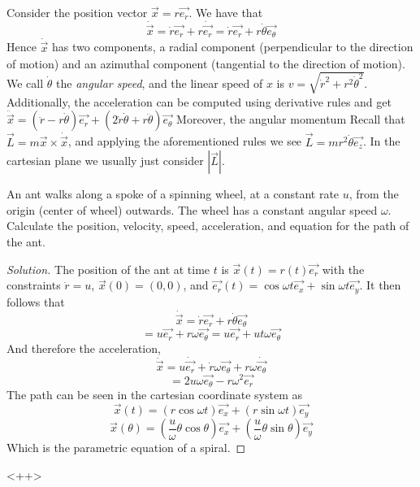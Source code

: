 \begin{example}
  Consider the position vector $\vec{x}=r\vec{e_r}$. We have that 
  \[\dot{\vec{x}}= \dot{r} \vec{e_r} + r\dot{\vec{e_r}} = \dot{r}\vec{e_r} +
  r\dot{\theta} \vec{e_{\theta}}\]
  Hence $\dot{\vec{x}}$ has two components, a radial component (perpendicular to
  the direction of motion) and an azimuthal component (tangential to the
  direction of motion). We call $\dot{\theta}$ the \emph{angular speed}, and the
  linear speed of $x$ is $v = \sqrt{\dot{r}^2 + r^2 \dot{\theta}^2}$.
  Additionally, the acceleration can be computed using derivative rules and get
  $\ddot{\vec{x}}= (\ddot{r} -r\dot{\theta})\vec{e_r} + (2\dot{r}\dot{\theta}
  +r\ddot{\theta})\vec{e_{\theta}}$
  Moreover, the angular momentum Recall that $\vec{L}= m\vec{x}\times
  \dot{\vec{x}}$, and applying the aforementioned rules we see $\vec{L}=
  mr^2\dot{\theta} \vec{e_z}$. In the cartesian plane we usually just consider
  $|\vec{L}|$.
\end{example}
\begin{example}
  An ant walks along a spoke of a spinning wheel, at a constant rate $u$, from the origin
  (center of wheel) outwards. The wheel has a constant angular speed $\omega$.
  Calculate the position, velocity, speed, acceleration, and equation for the
  path of the ant.
\end{example}
\begin{proof}[Solution]
  The position of the ant at time $t$ is $\vec{x}(t)=r(t)\vec{e_r}$ with the
  constraints $\dot{r}=u$, $\vec{x}(0)=(0,0)$, and $\vec{e_r}(t)=\cos{\omega
  t}\vec{e_x} + \sin{\omega t}\vec{e_y}$. It then follows that 
  \[\dot{\vec{x}} = \dot{r}\vec{e_r} + r\dot{\theta}\vec{e_{\theta}}\]
  \[= u\vec{e_r} + r\omega \vec{e_{\theta}} = u\vec{e_r} + ut\omega \vec{e_{\theta}}\]
  And therefore the acceleration,
  \[\ddot{\vec{x}} = u\dot{\vec{e_r}} + \dot{r}\omega\vec{e_{\theta}} +
  r\omega\dot{\vec{e_{\theta}}}\]
  \[= 2u\omega\vec{e_{\theta}} - r\omega^2
  \vec{e_{r}}\]
  The path can be seen in the cartesian coordinate system as
  \[\vec{x}(t) = (r\cos\omega t )\vec{e_x} + (r\sin\omega t)\vec{e_y} \]
  \[\vec{x}(\theta) = (\frac{u}{\omega}\theta \cos\theta)\vec{e_x} +
  (\frac{u}{\omega}\theta \sin\theta)\vec{e_y}\]
  Which is the parametric equation of a spiral.
\end{proof}<++>

